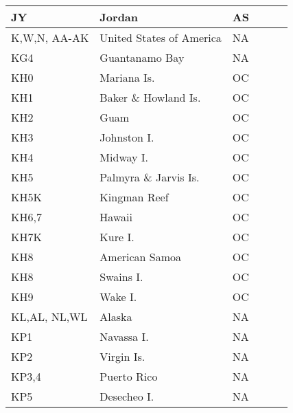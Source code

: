 \documentclass[a4paper]{article}
\begin{document}
\begin{longtable}{|p{1.5cm}|p{4cm}|l|p{2cm}|p{2cm}|p{2cm}|}
\hline
JY                     & Jordan                                     & AS    & & & \\
\hline
K,W,N, AA-AK           & United States of America                   & NA    & & & \\
\hline
KG4                    & Guantanamo Bay                             & NA    & & & \\
\hline
KH0                    & Mariana Is.                                & OC    & & & \\
\hline
KH1                    & Baker \& Howland Is.                       & OC    & & & \\
\hline
KH2                    & Guam                                       & OC    & & & \\
\hline
KH3                    & Johnston I.                                & OC    & & & \\
\hline
KH4                    & Midway I.                                  & OC    & & & \\
\hline
KH5                    & Palmyra \& Jarvis Is.                      & OC    & & & \\
\hline
KH5K                   & Kingman Reef                               & OC    & & & \\
\hline
KH6,7                  & Hawaii                                     & OC    & & & \\
\hline
KH7K                   & Kure I.                                    & OC    & & & \\
\hline
KH8                    & American Samoa                             & OC    & & & \\
\hline
KH8                    & Swains I.                                  & OC    & & & \\
\hline
KH9                    & Wake I.                                    & OC    & & & \\
\hline
KL,AL, NL,WL           & Alaska                                     & NA    & & & \\
\hline
KP1                    & Navassa I.                                 & NA    & & & \\
\hline
KP2                    & Virgin Is.                                 & NA    & & & \\
\hline
KP3,4                  & Puerto Rico                                & NA    & & & \\
\hline
KP5                    & Desecheo I.                                & NA    & & & \\

\end{longtable}
\end{document}
